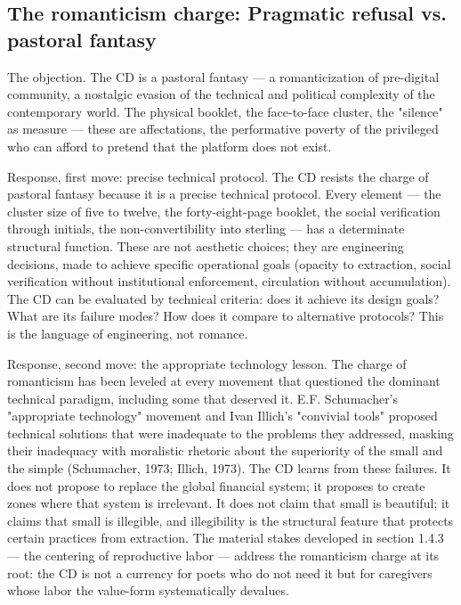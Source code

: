 \subsection{The romanticism charge: Pragmatic refusal vs. pastoral fantasy}

The objection. The CD is a pastoral fantasy — a romanticization of pre-digital community, a nostalgic evasion of the technical and political complexity of the contemporary world. The physical booklet, the face-to-face cluster, the "silence" as measure — these are affectations, the performative poverty of the privileged who can afford to pretend that the platform does not exist.

Response, first move: precise technical protocol. The CD resists the charge of pastoral fantasy because it is a precise technical protocol. Every element — the cluster size of five to twelve, the forty-eight-page booklet, the social verification through initials, the non-convertibility into sterling — has a determinate structural function. These are not aesthetic choices; they are engineering decisions, made to achieve specific operational goals (opacity to extraction, social verification without institutional enforcement, circulation without accumulation). The CD can be evaluated by technical criteria: does it achieve its design goals? What are its failure modes? How does it compare to alternative protocols? This is the language of engineering, not romance.

Response, second move: the appropriate technology lesson. The charge of romanticism has been leveled at every movement that questioned the dominant technical paradigm, including some that deserved it. E.F. Schumacher's "appropriate technology" movement and Ivan Illich's "convivial tools" proposed technical solutions that were inadequate to the problems they addressed, masking their inadequacy with moralistic rhetoric about the superiority of the small and the simple (Schumacher, 1973; Illich, 1973). The CD learns from these failures. It does not propose to replace the global financial system; it proposes to create zones where that system is irrelevant. It does not claim that small is beautiful; it claims that small is illegible, and illegibility is the structural feature that protects certain practices from extraction. The material stakes developed in section 1.4.3 — the centering of reproductive labor — address the romanticism charge at its root: the CD is not a currency for poets who do not need it but for caregivers whose labor the value-form systematically devalues.


